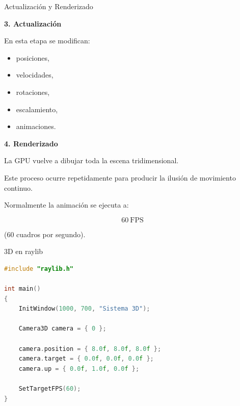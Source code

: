 \documentclass{beamer}
\begin{document}
\begin{frame}{Actualización y Renderizado}

\textbf{3. Actualización}

\vspace{0.2cm}

En esta etapa se modifican:

\begin{itemize}
    \item posiciones,
    \item velocidades,
    \item rotaciones,
    \item escalamiento,
    \item animaciones.
\end{itemize}

\vspace{0.5cm}

\textbf{4. Renderizado}

\vspace{0.2cm}

La GPU vuelve a dibujar toda la escena tridimensional.

\vspace{0.5cm}

Este proceso ocurre repetidamente para producir la ilusión de movimiento continuo.

\vspace{0.5cm}

Normalmente la animación se ejecuta a:

$$
60 \ \text{FPS}
$$

(60 cuadros por segundo).

\end{frame}



\begin{frame}[fragile]{3D en raylib}

\begin{lstlisting}[language=C++]
#include "raylib.h"

int main()
{
    InitWindow(1000, 700, "Sistema 3D");

    Camera3D camera = { 0 };

    camera.position = { 8.0f, 8.0f, 8.0f };
    camera.target = { 0.0f, 0.0f, 0.0f };
    camera.up = { 0.0f, 1.0f, 0.0f };

    SetTargetFPS(60);
}
\end{lstlisting}

\end{frame}
\end{document}
